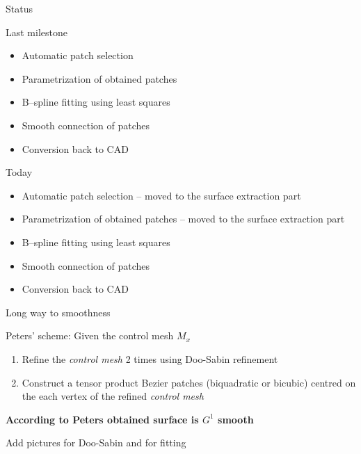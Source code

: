 \newcommand{\norm}[1]{\parallel #1 \parallel_2}

\begin{frame}{Status}
\begin{block}{Last milestone}
\begin{itemize}
	\item[\textcolor{red}{\XSolidBrush}] Automatic patch selection
	\item[\textcolor{red}{\XSolidBrush}] Parametrization of obtained patches
	\item[\textcolor{green}{\Checkmark}] B--spline fitting using least squares
	\item[\textcolor{black}{\VarClock}] Smooth connection of patches
	\item[\textcolor{red}{\XSolidBrush}] Conversion back to CAD
\end{itemize}
\end{block}
\begin{block}{Today}
\begin{itemize}
	\item[\textcolor{green}{\Checkmark}] Automatic patch selection -- {\color{gray}moved to the surface extraction part}
	\item[\textcolor{green}{\Checkmark}] Parametrization of obtained patches -- {\color{gray} moved to the surface extraction part}
	\item[\textcolor{green}{\Checkmark}] B--spline fitting using least squares
	\item[\textcolor{green}{\Checkmark}] Smooth connection of patches
	\item[\textcolor{red}{\XSolidBrush}] Conversion back to CAD
\end{itemize}
\end{block}
\end{frame}
\begin{frame}{Long way to smoothness}
\begin{block}{Peters' scheme:}
Given the control mesh $M_{x}$
\begin{enumerate}
\item Refine the \textit{control mesh} 2 times using Doo-Sabin refinement
\item Construct a tensor product Bezier patches (biquadratic or bicubic) centred on the each vertex of the refined \textit{control mesh}
\end{enumerate}
\end{block}
\textbf{{\color{red} According to Peters obtained surface is $G^{1}$ smooth}}

Add pictures for Doo-Sabin and for fitting
\end{frame}
